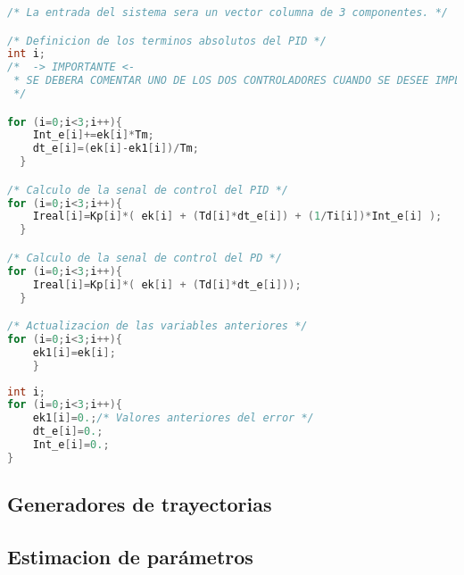 \begin{lstlisting}[language=C,style=CStyle, caption={Controlador.c}]
/* La entrada del sistema sera un vector columna de 3 componentes. */

/* Definicion de los terminos absolutos del PID */
int i;
/*  -> IMPORTANTE <-
 * SE DEBERA COMENTAR UNO DE LOS DOS CONTROLADORES CUANDO SE DESEE IMPLEMENTAR
 */

for (i=0;i<3;i++){
	Int_e[i]+=ek[i]*Tm;
	dt_e[i]=(ek[i]-ek1[i])/Tm;
  }

/* Calculo de la senal de control del PID */
for (i=0;i<3;i++){
	Ireal[i]=Kp[i]*( ek[i] + (Td[i]*dt_e[i]) + (1/Ti[i])*Int_e[i] );
  }

/* Calculo de la senal de control del PD */
for (i=0;i<3;i++){
	Ireal[i]=Kp[i]*( ek[i] + (Td[i]*dt_e[i]));
  }

/* Actualizacion de las variables anteriores */
for (i=0;i<3;i++){
	ek1[i]=ek[i];
	}
\end{lstlisting}

\begin{lstlisting}[language=C,style=CStyle, caption={Inicializaciones.c}]
int i;
for (i=0;i<3;i++){
	ek1[i]=0.;/* Valores anteriores del error */
	dt_e[i]=0.;
	Int_e[i]=0.;
}
\end{lstlisting}

\subsection{Generadores de trayectorias}
\subsection{Estimacion de parámetros}
